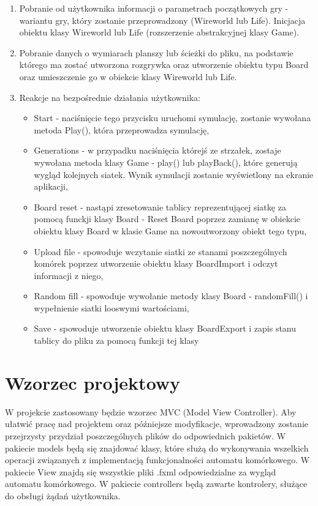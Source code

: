 \documentclass[10pt, oneside]{article}
\begin{document}
\begin{enumerate}
\item Pobranie od użytkownika informacji o parametrach początkowych gry - wariantu gry, który zostanie przeprowadzony (Wireworld lub Life). Inicjacja obiektu klasy Wireworld lub Life (rozszerzenie abstrakcyjnej klasy Game).
\item  Pobranie danych o wymiarach planszy lub ścieżki do pliku, na podstawie którego ma zostać utworzona rozgrywka oraz utworzenie obiektu typu Board oraz umieszczenie go w obiekcie klasy Wireworld lub Life.
\item Reakcje na bezpośrednie działania użytkownika:
	\begin {itemize}
	\item Start -  naciśnięcie tego przycisku uruchomi symulację, zostanie wywołana metoda Play(), która przeprowadza symulację,
	\item Generations - w przypadku naciśnięcia którejś ze strzałek, zostaje wywołana metoda klasy Game -  play() lub playBack(), które generują wygląd kolejnych siatek. Wynik symulacji 			zostanie wyświetlony na ekranie aplikacji,
	\item Board reset - nastąpi zresetowanie tablicy reprezentującej siatkę za pomocą funckji klasy Board - Reset Board poprzez zamianę w obiekcie obiektu klasy Board w klasie Game na nowoutworzony obiekt tego typu,
	\item Upload file - spowoduje wczytanie siatki ze stanami poszczególnych komórek poprzez utworzenie obiektu klasy BoardImport  i odczyt informacji z niego,
	\item Random fill -  spowoduje wywołanie metody klasy Board - randomFill() i  wypełnienie siatki looswymi wartościami,
	\item Save - spowoduje utworzenie obiektu klasy BoardExport i zapis stanu tablicy do pliku za pomocą funkcji tej klasy
\end{itemize}
\end {enumerate}

\section{Wzorzec projektowy}
W projekcie zastosowany będzie wzorzec MVC (Model View Controller). Aby ułatwić pracę nad projektem oraz późniejsze modyfikacje, wprowadzony zostanie przejrzysty przydział poszczególnych plików do odpowiednich pakietów. 
W pakiecie models będą się znajdować klasy, które służą do wykonywania wszelkich operacji związanych z implementacją funkcjonalności automatu komórkowego.
W pakiecie View znajdą się wszystkie pliki .fxml odpowiedzialne za wygląd automatu komórkowego.
W pakiecie controllers będą zawarte kontrolery, służące do obsługi żądań użytkownika.
\end{document}
